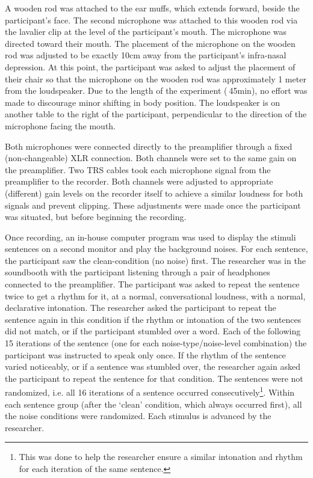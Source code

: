\documentclass[dissertation,copyright]{uathesis}
\begin{document}
A wooden rod was attached to the ear muffs, which extends forward, beside the participant's face.  The second microphone was attached to this wooden rod via the lavalier clip at the level of the participant's mouth.  The microphone was directed toward their mouth. %
The placement of the microphone on the wooden rod was adjusted to be exactly 10cm away from the participant's infra-nasal depression.  At this point, the participant was asked to adjust the placement of their chair so that the microphone on the wooden rod was approximately 1 meter from the loudspeaker. Due to the length of the experiment ($~$45min), no effort was made to discourage minor shifting in body position.  The loudspeaker is on another table to the right of the participant, perpendicular to the direction of the microphone facing the mouth.

Both microphones were connected directly to the preamplifier through a fixed (non-changeable) XLR connection.  Both channels were set to the same gain on the preamplifier.  Two TRS cables took each microphone signal from the preamplifier to the recorder.  Both channels were adjusted to appropriate (different) gain levels on the recorder itself to achieve a similar loudness for both signals and prevent clipping.  These adjustments were made once the participant was situated, but before beginning the recording.

Once recording, an in-house computer program was used to display the stimuli sentences on a second monitor and play the background noises.  For each sentence, the participant saw the clean-condition (no noise) first.  The researcher was in the soundbooth with the participant listening through a pair of headphones connected to the preamplifier.  The participant was asked to repeat the sentence twice to get a rhythm for it, at a normal, conversational loudness, with a normal, declarative intonation.  The researcher asked the participant to repeat the sentence again in this condition if the rhythm or intonation of the two sentences did not match, or if the participant stumbled over a word.  Each of the following 15 iterations of the sentence (one for each noise-type/noise-level combination) the participant was instructed to speak only once.  If the rhythm of the sentence varied noticeably, or if a sentence was stumbled over, the researcher again asked the participant to repeat the sentence for that condition.  The sentences were not randomized, i.e. all 16 iterations of a sentence occurred consecutively\footnote{This was done to help the researcher ensure a similar intonation and rhythm for each iteration of the same sentence.}. Within each sentence group (after the `clean' condition, which always occurred first), all the noise conditions were randomized. Each stimulus is advanced by the researcher.
\end{document}
